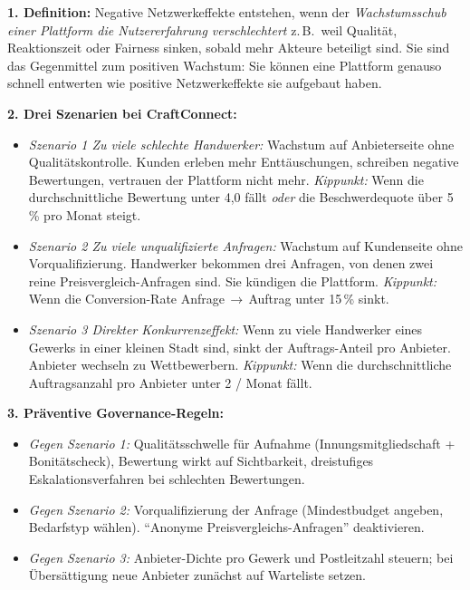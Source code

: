 \documentclass[11pt,a4paper,oneside]{article}
\begin{document}
\begin{loesungbox}
\textbf{1. Definition:}
Negative Netzwerkeffekte entstehen, wenn der \emph{Wachstumsschub einer Plattform die Nutzererfahrung verschlechtert} \textendash{} z.\,B.\ weil Qualität, Reaktionszeit oder Fairness sinken, sobald mehr Akteure beteiligt sind. Sie sind das Gegenmittel zum positiven Wachstum: Sie können eine Plattform genauso schnell entwerten wie positive Netzwerkeffekte sie aufgebaut haben.

\textbf{2. Drei Szenarien bei CraftConnect:}
\begin{itemize}
  \item \emph{Szenario 1 \textendash{} Zu viele schlechte Handwerker:} Wachstum auf Anbieterseite ohne Qualitätskontrolle. Kunden erleben mehr Enttäuschungen, schreiben negative Bewertungen, vertrauen der Plattform nicht mehr. \emph{Kippunkt:} Wenn die durchschnittliche Bewertung unter 4,0 fällt \emph{oder} die Beschwerdequote über 5\,\% pro Monat steigt.
  \item \emph{Szenario 2 \textendash{} Zu viele unqualifizierte Anfragen:} Wachstum auf Kundenseite ohne Vorqualifizierung. Handwerker bekommen drei Anfragen, von denen zwei reine Preisvergleich-Anfragen sind. Sie kündigen die Plattform. \emph{Kippunkt:} Wenn die Conversion-Rate Anfrage\,$\rightarrow$\,Auftrag unter 15\,\% sinkt.
  \item \emph{Szenario 3 \textendash{} Direkter Konkurrenzeffekt:} Wenn zu viele Handwerker eines Gewerks in einer kleinen Stadt sind, sinkt der Auftrags-Anteil pro Anbieter. Anbieter wechseln zu Wettbewerbern. \emph{Kippunkt:} Wenn die durchschnittliche Auftragsanzahl pro Anbieter unter 2 / Monat fällt.
\end{itemize}

\textbf{3. Präventive Governance-Regeln:}
\begin{itemize}
  \item \emph{Gegen Szenario 1:} Qualitätsschwelle für Aufnahme (Innungsmitgliedschaft + Bonitätscheck), Bewertung wirkt auf Sichtbarkeit, dreistufiges Eskalationsverfahren bei schlechten Bewertungen.
  \item \emph{Gegen Szenario 2:} Vorqualifizierung der Anfrage (Mindestbudget angeben, Bedarfstyp wählen). ``Anonyme Preisvergleichs-Anfragen'' deaktivieren.
  \item \emph{Gegen Szenario 3:} Anbieter-Dichte pro Gewerk und Postleitzahl steuern; bei Übersättigung neue Anbieter zunächst auf Warteliste setzen.
\end{itemize}


\end{loesungbox}
\end{document}
